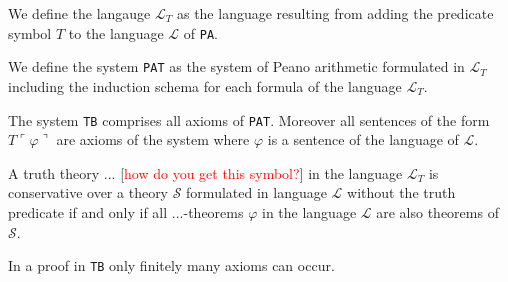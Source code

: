 %

\begin{definition}[$\mathcal{L}_T$]
    \label{def:LT}
    We define the langauge $\mathcal{L}_T$ as the language resulting from adding the predicate symbol $T$ to the language $\mathcal{L}$ of \texttt{PA}. 
\end{definition}

\begin{definition}
    \label{def:PAT}
    We define the system \texttt{PAT} as the system of Peano arithmetic formulated in $\mathcal{L}_T$ including the induction schema for each formula of the language $\mathcal{L}_T$.
\end{definition}

\begin{definition}[\texttt{TB}]
    \label{def:TB}
    The system \texttt{TB} comprises all axioms of \texttt{PAT}. Moreover all sentences of the form $T\ulcorner\varphi\urcorner$ are axioms of the system where $\varphi$ is a sentence of the language of $\mathcal{L}$.
\end{definition}

\begin{definition}[conservativity]
    \label{def:cons}
    A truth theory $...$ [\textcolor{red}{how do you get this symbol?}] in the language $\mathcal{L}_T$ is conservative over a theory $\mathcal{S}$ formulated in language $\mathcal{L}$ without the truth predicate if and only if all $...$-theorems $\varphi$ in the language $\mathcal{L}$ are also theorems of $\mathcal{S}$.
\end{definition}

\begin{lemma}
    \label{lem:finit-ax-tb}
    In a proof in \texttt{TB} only finitely many axioms can occur.
\end{lemma}


